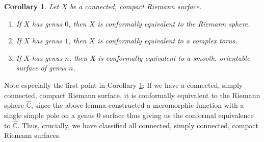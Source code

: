 \documentclass[11pt]{report}
\newtheorem{cor}[thm]{Corollary}
\theoremstyle{definition}
\begin{document}
\begin{cor}\label{ClassificationByGenus}
  Let $X$ be a connected, compact Riemann surface. 
  \begin{enumerate}
    \item If $X$ has genus $0$, then $X$ is conformally equivalent to the Riemann sphere. 
    \item If $X$ has genus $1$, then $X$ is conformally equivalent to a complex torus.
    \item If $X$ has genus $n$, then $X$ is conformally equivalent to a smooth, orientable surface of genus $n$.
  \end{enumerate}
\end{cor}
Note especially the first point in Corollary \ref{ClassificationByGenus}: If we have a connected, simply connected, compact Riemann surface, it is conformally equivalent to the Riemann sphere $\widehat{\mathbb{C}}$, since the above lemma constructed a meromorphic function with a single simple pole on a genus $0$ surface thus giving us the conformal equivalence to $\widehat{\mathbb{C}}$. Thus, crucially, we have classified all connected, simply connected, compact Riemann surfaces.
\end{document}
